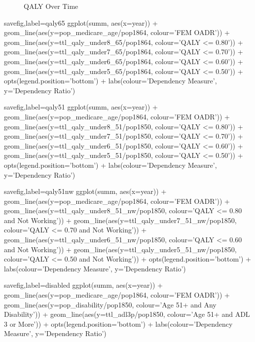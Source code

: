 \documentclass{article}
\begin{document}
\begin{figure}[ht]
\centering
{}
\caption{QALY Over Time}
\end{figure}

\begin{Rcode}{savefig,label=qaly65}
ggplot(summ, aes(x=year)) + 
geom_line(aes(y=pop_medicare_age/pop1864, colour='FEM OADR')) + 
geom_line(aes(y=ttl_qaly_under8_65/pop1864, colour='QALY <= 0.80')) + 
geom_line(aes(y=ttl_qaly_under7_65/pop1864, colour='QALY <= 0.70')) + 
geom_line(aes(y=ttl_qaly_under6_65/pop1864, colour='QALY <= 0.60')) + 
geom_line(aes(y=ttl_qaly_under5_65/pop1864, colour='QALY <= 0.50')) +
opts(legend.position='bottom') + labs(colour='Dependency Measure', y='Dependency Ratio')
\end{Rcode}

\begin{Rcode}{savefig,label=qaly51}
ggplot(summ, aes(x=year)) + 
geom_line(aes(y=pop_medicare_age/pop1864, colour='FEM OADR')) + 
geom_line(aes(y=ttl_qaly_under8_51/pop1850, colour='QALY <= 0.80')) +
geom_line(aes(y=ttl_qaly_under7_51/pop1850, colour='QALY <= 0.70')) + 
geom_line(aes(y=ttl_qaly_under6_51/pop1850, colour='QALY <= 0.60')) + 
geom_line(aes(y=ttl_qaly_under5_51/pop1850, colour='QALY <= 0.50')) +
 opts(legend.position='bottom') + labs(colour='Dependency Measure', y='Dependency Ratio')
\end{Rcode}

\begin{Rcode}{savefig,label=qaly51nw}
ggplot(summ, aes(x=year)) + 
geom_line(aes(y=pop_medicare_age/pop1864, colour='FEM OADR')) + 
geom_line(aes(y=ttl_qaly_under8_51_nw/pop1850, colour='QALY <= 0.80 and Not Working')) + 
geom_line(aes(y=ttl_qaly_under7_51_nw/pop1850, colour='QALY <= 0.70 and Not Working')) + 
geom_line(aes(y=ttl_qaly_under6_51_nw/pop1850, colour='QALY <= 0.60 and Not Working')) + 
geom_line(aes(y=ttl_qaly_under5_51_nw/pop1850, colour='QALY <= 0.50 and Not Working')) +
opts(legend.position='bottom') + labs(colour='Dependency Measure', y='Dependency Ratio')
\end{Rcode}

\begin{Rcode}{savefig,label=disabled}
ggplot(summ, aes(x=year)) + geom_line(aes(y=pop_medicare_age/pop1864, colour='FEM OADR')) + 
geom_line(aes(y=pop_disability/pop1850, colour='Age 51+ and Any Disability')) + 
geom_line(aes(y=ttl_adl3p/pop1850, colour='Age 51+ and ADL 3 or More')) + opts(legend.position='bottom') + labs(colour='Dependency Measure', y='Dependency Ratio')
\end{Rcode}
\end{document}

